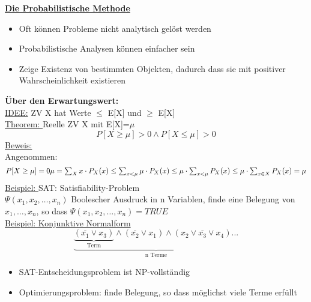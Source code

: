 \documentclass{article}
\begin{document}
	\newpage
	\textbf{\underline{Die Probabilistische Methode}} \\
	\begin{itemize}
		\item Oft können Probleme nicht analytisch gelöst werden
		\item Probabilistische Analysen können einfacher sein
		\item Zeige Existenz von bestimmten Objekten, dadurch dass sie mit positiver Wahrscheinlichkeit existieren
	\end{itemize}
	\textbf{Über den Erwartungswert:} \\
	\underline{IDEE:} ZV X hat Werte $\leq$ E[X] und $\geq$ E[X] \\
	\underline{Theorem: }Reelle ZV X mit E[X]=$\mu$
	\[
		P[X\geq \mu] > 0 \wedge P[X\leq \mu] > 0
	\] 
	\underline{Beweis: } \\
	Angenommen:
	\[
		P[X \geq \mu] = 0 $$ $$
		\mu = \sum_X x \cdot P_X(x) \leq \sum_{x<\mu} \mu \cdot P_X(x) \leq \mu \cdot \sum_{x<\mu} P_X(x) \leq \mu \cdot \sum_{x \in X} P_X(x) = \mu 	
	\]
	\underline{Beispiel: } SAT: Satisfiability-Problem \\
	$\Psi(x_1, x_2, \ldots , x_n)$ Boolescher Ausdruck in n Variablen, finde eine Belegung von $x_1, \ldots , x_n$, so dass $\Psi(x_1, x_2, \ldots , x_n)=TRUE$ \\
	\underline{Beispiel: Konjunktive Normalform} \\
	\[
		\underbrace{\underbrace{(\overline{x_1}\vee x_3)}_{\text{Term}}\wedge (\overline{x_2}\vee x_1)\wedge (x_2 \vee \overline{x_3} \vee x_4) ...}_{\text{n Terme}}
	\]
	\begin{itemize}
		\item SAT-Entscheidungsproblem ist NP-vollständig
		\item Optimierungsproblem: finde Belegung, so dass möglichst viele Terme erfüllt
	\end{itemize}
\end{document}
